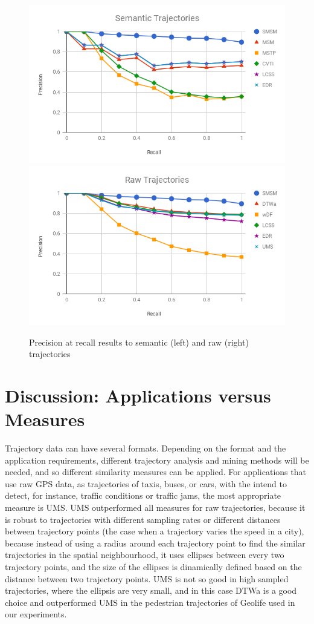 \documentclass[12pt]{article}
\begin{document}
\begin{figure}[ht!]
\centerline{
\centering
\includegraphics[width=.55\textwidth]{Images/P_R-chart_Geolife.png}
\includegraphics[width=.55\textwidth]{Images/P_R-chart_Geolife-raw.png}
}
\caption{Precision at recall results to semantic (left) and raw (right) trajectories}
\label{fig:geolife_precision_recall}
\end{figure}

\section{Discussion: Applications versus Measures}\label{sec:discussion}

{Trajectory data can have several formats. Depending on the format and the application requirements, different trajectory analysis and mining methods will be needed, and so different similarity measures can be applied. For applications that use raw GPS data, as trajectories of taxis, buses, or cars, with the intend to detect, for instance, traffic conditions or traffic jams, the most appropriate measure is UMS. UMS outperformed all measures for raw trajectories, because it is robust to trajectories with different sampling rates or different distances between trajectory points (the case when a trajectory varies the speed in a city), because instead of using a radius around each trajectory point to find the similar trajectories in the spatial neighbourhood, it uses ellipses between every two trajectory points, and the size of the ellipses is dinamically defined based on the distance between two trajectory points. UMS is not so good in high sampled trajectories, where the ellipsis are very small, and in this case DTWa is  a good choice and outperformed UMS in the pedestrian trajectories of Geolife used in our experiments.}
\end{document}

